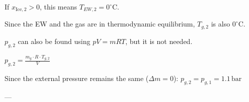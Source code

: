 If \( x_{\text{Ice},2} > 0 \), this means \( T_{EW,2} = 0^\circ \text{C} \).  

Since the EW and the gas are in thermodynamic equilibrium, \( T_{g,2} \) is also \( 0^\circ \text{C} \).  

\( p_{g,2} \) can also be found using \( pV = mRT \), but it is not needed.

\( p_{g,2} = \frac{m_g \cdot R \cdot T_{g,2}}{V} \)  

Since the external pressure remains the same (\( \Delta m = 0 \)):  
\( p_{g,2} = p_{g,1} = 1.1 \, \text{bar} \)  

---